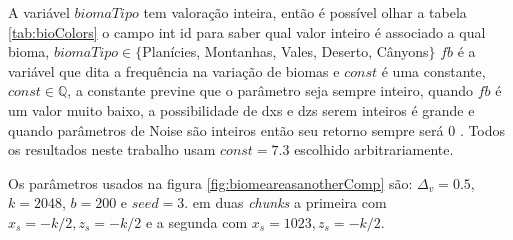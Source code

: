 A variável $biomaTipo$ tem valoração inteira, então é possível olhar a tabela \ref{tab:bioColors}
o campo int id para saber qual valor inteiro é associado a qual bioma, $biomaTipo \in \{$Planícies, Montanhas, Vales, Deserto, Cânyons$\}$
$fb$ é a variável que dita a frequência na variação de biomas e $const$ é uma constante,
$const \in \mathbb{Q}$, a constante previne que o parâmetro seja sempre inteiro, quando $fb$ é um valor muito baixo,
a possibilidade de dxs e dzs serem inteiros é grande e quando parâmetros de Noise 
são inteiros então seu retorno sempre será $0$ \cite{perlin1985image}. Todos os resultados 
neste trabalho usam $const = 7.3$ escolhido arbitrariamente.

Os parâmetros usados na figura \ref{fig:biomeareasanotherComp} são: $\Delta_{v} = 0.5$, 
$k = 2048$, $b = 200$ e $seed = 3$. em duas \textit{chunks} a primeira com $ x_{s} = -k/2 , z_{s} = -k/2$
e a segunda com $ x_{s} = 1023 , z_{s} = -k/2$.

